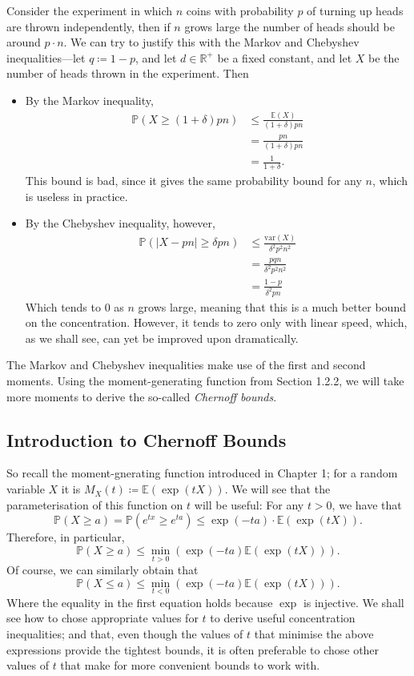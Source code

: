 	Consider the experiment in which $n$ coins with probability $p$ of turning up heads are 
	thrown independently, then if $n$ grows large the number of heads should be around $p\cdot 
	n$. We can try to justify this with the Markov and Chebyshev inequalities---let $q 
	\coloneqq 1-p$, and let $d \in \mathbb{R}^+$ be a fixed constant, and let $X$ be the 
	number of heads thrown in the experiment. Then
	\begin{itemize}
		\item By the Markov inequality,
		\begin{align}
			\nonumber
			\mathbb{P}(X \geq (1+\delta)pn) &\leq \frac{\mathbb{E}(X)}{(1+\delta)pn} \\
			&= \frac{pn}{(1+\delta)pn} \nonumber \\
			&= \frac{1}{1+\delta} \label{badmarkovbound}.
		\end{align}
		This bound is bad, since it gives the same probability bound for any $n$, which is 
		useless in practice.
		\item By the Chebyshev inequality, however,
		\begin{align}
			\nonumber
			\mathbb{P}(|X-pn|\geq\delta pn)&\leq\frac{\mathrm{var}(X)}{\delta^2p^2n^2}\\
			&= \frac{pqn}{\delta^2p^2n^2} \nonumber\\
			&= \frac{1-p}{\delta^2pn} \label{betterchebbound}
		\end{align}
		Which tends to 0 as $n$ grows large, meaning that this is a much better bound on 
		the concentration. However, it tends to zero only with linear speed, which, as we 
		shall see, can yet be improved upon dramatically.
	\end{itemize}
	The Markov and Chebyshev inequalities make use of the first and second moments. Using the 
	moment-generating function from Section 1.2.2, we will take more moments to derive the 
	so-called \emph{Chernoff bounds}.

	\subsection{Introduction to Chernoff Bounds}
	So recall the moment-gnerating function introduced in Chapter 1; for a random variable $X$
	it is $M_X(t) \coloneqq \mathbb{E}(\exp(tX))$. We will see that the parameterisation 
	of this function on $t$ will be useful: For any $t > 0$, we have that 
	$$
		\mathbb{P}(X\geq a)=
		\mathbb{P}(e^{tx}\geq e^{ta})\leq\exp(-ta)\cdot\mathbb{E}(\exp(tX)).
	$$
	Therefore, in particular, 
	$$
		\mathbb{P}(X\geq a)\leq\min_{t>0}(\exp(-ta)\mathbb{E}(\exp(tX))).
	$$
	Of course, we can similarly obtain that 
	$$
		\mathbb{P}(X\leq a)\leq\min_{t<0}(\exp(-ta)\mathbb{E}(\exp(tX))).
	$$
	Where the equality in the first equation holds because $\exp$ is injective. We shall see
	how to chose appropriate values for $t$ to derive useful concentration inequalities; and 
	that, even though the values of $t$ that minimise the above expressions provide the 
	tightest bounds, it is often preferable to chose other values of $t$ that make for more 
	convenient bounds to work with. \par

